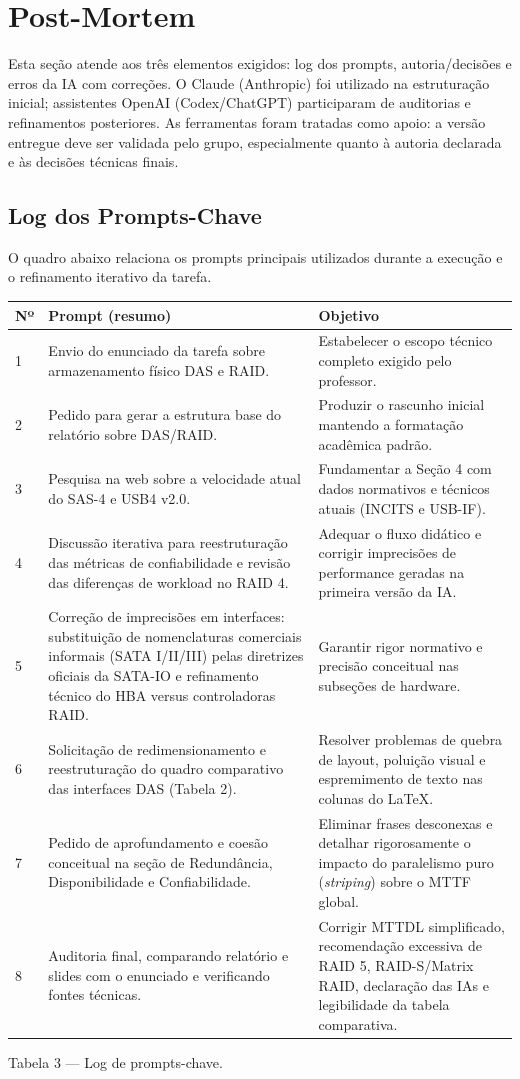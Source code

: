 \documentclass[11pt,a4paper]{article}
\begin{document}
\clearpage
\section{Post-Mortem}\label{sec:postmortem}
Esta seção atende aos três elementos exigidos: log dos prompts, autoria/decisões e erros da IA com correções. O Claude (Anthropic) foi utilizado na estruturação inicial; assistentes OpenAI (Codex/ChatGPT) participaram de auditorias e refinamentos posteriores. As ferramentas foram tratadas como apoio: a versão entregue deve ser validada pelo grupo, especialmente quanto à autoria declarada e às decisões técnicas finais.

\subsection{Log dos Prompts-Chave}
O quadro abaixo relaciona os prompts principais utilizados durante a execução e o refinamento iterativo da tarefa.

\begin{longtable}{@{}p{.7cm}p{7.3cm}p{6.4cm}@{}}\toprule
\textbf{Nº} & \textbf{Prompt (resumo)} & \textbf{Objetivo}\\\midrule\endhead
1 & Envio do enunciado da tarefa sobre armazenamento físico DAS e RAID. & Estabelecer o escopo técnico completo exigido pelo professor.\\
2 & Pedido para gerar a estrutura base do relatório sobre DAS/RAID. & Produzir o rascunho inicial mantendo a formatação acadêmica padrão.\\
3 & Pesquisa na web sobre a velocidade atual do SAS-4 e USB4 v2.0. & Fundamentar a Seção 4 com dados normativos e técnicos atuais (INCITS e USB-IF).\\
4 & Discussão iterativa para reestruturação das métricas de confiabilidade e revisão das diferenças de workload no RAID 4. & Adequar o fluxo didático e corrigir imprecisões de performance geradas na primeira versão da IA.\\
5 & Correção de imprecisões em interfaces: substituição de nomenclaturas comerciais informais (SATA I/II/III) pelas diretrizes oficiais da SATA-IO e refinamento técnico do HBA versus controladoras RAID. & Garantir rigor normativo e precisão conceitual nas subseções de hardware.\\
6 & Solicitação de redimensionamento e reestruturação do quadro comparativo das interfaces DAS (Tabela 2). & Resolver problemas de quebra de layout, poluição visual e espremimento de texto nas colunas do LaTeX.\\
7 & Pedido de aprofundamento e coesão conceitual na seção de Redundância, Disponibilidade e Confiabilidade. & Eliminar frases desconexas e detalhar rigorosamente o impacto do paralelismo puro (\textit{striping}) sobre o MTTF global.\\
8 & Auditoria final, comparando relatório e slides com o enunciado e verificando fontes técnicas. & Corrigir MTTDL simplificado, recomendação excessiva de RAID 5, RAID-S/Matrix RAID, declaração das IAs e legibilidade da tabela comparativa.\\\bottomrule
\end{longtable}
Tabela 3 --- Log de prompts-chave.
\end{document}
